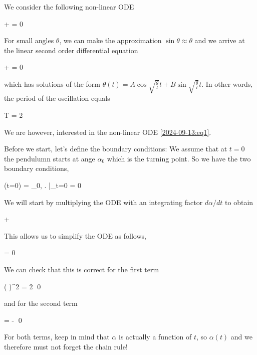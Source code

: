 

We consider the following non-linear ODE

\be\label{2024-09-13:eq1}
 +  \sin \theta = 0
\ee

For small angles $\theta$, we can make the approximation $\sin \theta \approx \theta$ and we arrive at the linear second order differential equation

\bee
{} +  \theta = 0
\eee

which has solutions of the form $\theta(t) = A \cos \sqrt{\frac{g}{l}}t + B \sin \sqrt{\frac{g}{l}}t$. In other words, the period of the oscillation equals

\bee
T = 2 \pi {}
\eee

We are however, interested in the non-linear ODE \eqref{2024-09-13:eq1}.


Before we start, let's define the boundary conditions: We assume that at $t=0$ the pendulumn starts at ange $\alpha_0$ which is the turning point. So we have the two boundary conditions,

\be\label{2024-09-13:eq2}
\alpha(t=0) = \alpha_0, \quad \left. \right|_{t=0} = 0
\ee

We will start by multiplying the ODE with an integrating factor $d \alpha / dt$ to obtain

\bee
{}  +   \sin \alpha
\eee

This allows us to simplify the ODE as follows,

\bee
{}  = 0
\eee

We can check that this is correct for the first term

\bee
{}  \left( \right)^2 = 2    \qed
\eee

and for the second term

\bee
{}  \cos \alpha = - \sin \alpha {} \qed
\eee

For both terms, keep in mind that $\alpha$ is actually a function of $t$, so $\alpha(t)$ and we therefore must not forget the chain rule!

